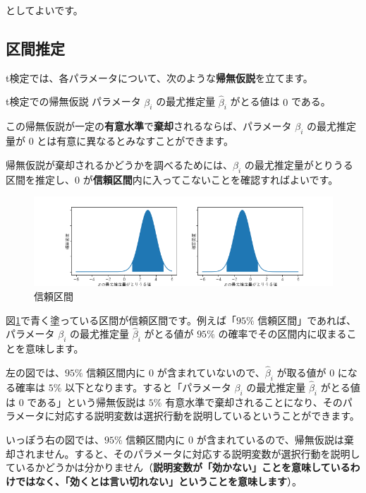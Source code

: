 としてよいです。

\subsection{区間推定}\label{ssec:interval_est}

t検定では、各パラメータについて、次のような\textbf{帰無仮説}を立てます。

\begin{itembox}[l]{t検定での帰無仮説}
    パラメータ $\beta_i$ の最尤推定量 $\hat\beta_i$ がとる値は $0$ である。
\end{itembox}

この帰無仮説が一定の\textbf{有意水準}で\textbf{棄却}されるならば、パラメータ $\beta_i$ の最尤推定量が $0$ とは有意に異なるとみなすことができます。

帰無仮説が棄却されるかどうかを調べるためには、$\beta_i$ の最尤推定量がとりうる区間を推定し、$0$ が\textbf{信頼区間}内に入ってこないことを確認すればよいです。

\begin{figure}[ht]
    \centering
    \includegraphics[width=0.9\hsize]{figure/interval_estimation.png}
    \caption{信頼区間}
    \label{fig:interval_est}
\end{figure}


図\ref{fig:interval_est}で青く塗っている区間が信頼区間です。例えば「$95\%$ 信頼区間」であれば、パラメータ $\beta_i$ の最尤推定量 $\hat\beta_i$ がとる値が $95\%$ の確率でその区間内に収まることを意味します。

左の図では、$95\%$ 信頼区間内に $0$ が含まれていないので、$\hat\beta_i$ が取る値が $0$ になる確率は $5\%$ 以下となります。すると「パラメータ $\beta_i$ の最尤推定量 $\hat\beta_i$ がとる値は $0$ である」という帰無仮説は $5\%$ 有意水準で棄却されることになり、そのパラメータに対応する説明変数は選択行動を説明しているということができます。

いっぽう右の図では、$95\%$ 信頼区間内に $0$ が含まれているので、帰無仮説は棄却されません。すると、そのパラメータに対応する説明変数が選択行動を説明しているかどうかは分かりません（\textbf{説明変数が「効かない」ことを意味しているわけではなく、「効くとは言い切れない」ということを意味します}）。

